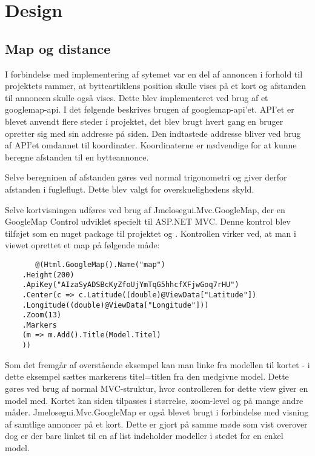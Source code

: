 \chapter{Design}

\section{Map og distance}
I forbindelse med implementering af sytemet var en del af annoncen i forhold til projektets rammer, at bytteartiklens position skulle vises på et kort og afstanden til annoncen skulle også vises. Dette blev implementeret ved brug af et googlemap-api.
I det følgende beskrives brugen af googlemap-api'et. API'et er blevet anvendt flere steder i projektet, det blev brugt hvert gang en bruger opretter sig med sin addresse på siden. Den indtastede addresse bliver ved brug af API'et omdannet til koordinater. Koordinaterne er nødvendige for at kunne beregne afstanden til en bytteannonce.

Selve beregninen af afstanden gøres ved normal trigonometri og giver derfor afstanden i fugleflugt. Dette blev valgt for overskuelighedens skyld. 

Selve kortvisningen udføres ved brug af Jmelosegui.Mvc.GoogleMap, der en GoogleMap Control udviklet specielt til ASP.NET MVC. Denne kontrol blev tilføjet som en nuget package til projektet og . Kontrollen virker ved, at man i viewet oprettet et map på følgende måde:
\begin{verbatim}
	   @(Html.GoogleMap().Name("map")
	.Height(200)
	.ApiKey("AIzaSyADSBcKyZfoUjYmTqG5hhcfXFjwGoq7rHU")
	.Center(c => c.Latitude((double)@ViewData["Latitude"])
	.Longitude((double)@ViewData["Longitude"]))
	.Zoom(13)
	.Markers
	(m => m.Add().Title(Model.Titel)
	))
\end{verbatim}

Som det fremgår af overstående eksempel kan man linke fra modellen til kortet - i dette eksempel sættes markerens titel=titlen fra den medgivne model. Dette gøres ved brug af normal MVC-struktur, hvor controlleren for dette view giver en model med. Kortet kan siden tilpasses i størrelse, zoom-level og på mange andre måder.
Jmelosegui.Mvc.GoogleMap er også blevet brugt i forbindelse med visning af samtlige annoncer på et kort. Dette er gjort på samme møde som vist overover dog er der bare linket til en af list indeholder modeller i stedet for en enkel model.
